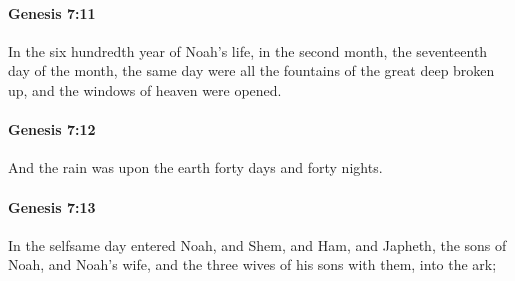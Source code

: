 		\paragraph{Genesis 7:11} %
			\label{GENESIS-7-11}

			In the six hundredth year of Noah's life, in the second month, the seventeenth day of the month, the same day were all the fountains of the great deep broken up, and the windows of heaven were opened.


		\paragraph{Genesis 7:12} %
			\label{GENESIS-7-12}

			And the rain was upon the earth forty days and forty nights.


		\paragraph{Genesis 7:13} %
			\label{GENESIS-7-13}

			In the selfsame day entered Noah, and Shem, and Ham, and Japheth, the sons of Noah, and Noah's wife, and the three wives of his sons with them, into the ark;


